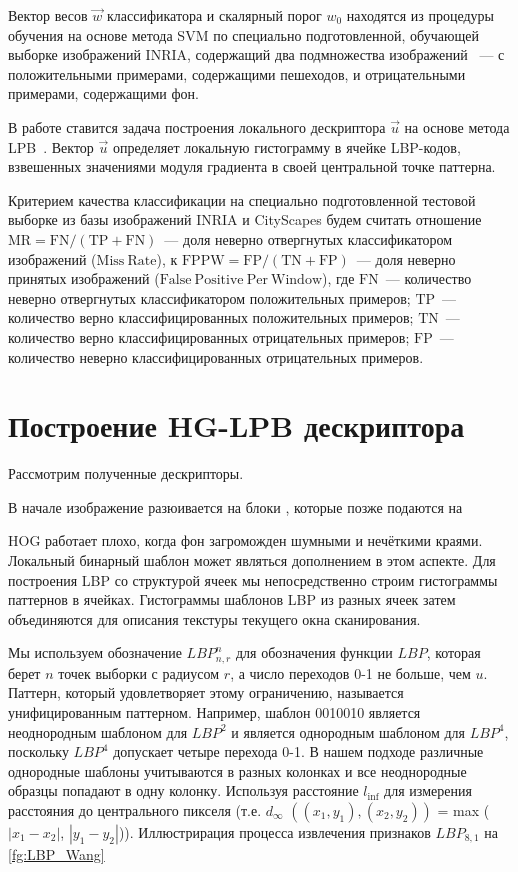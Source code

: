 \documentclass[12pt,twoside]{article}
\begin{document}
	Вектор весов $\vec{w}$ классификатора и скалярный порог $w_{0}$ находятся из процедуры обучения на основе метода SVM \cite{dalaltriggs2005} по специально подготовленной, обучающей выборке изображений INRIA, содержащий два подмножества изображений ~--- с положительными примерами, содержащими пешеходов, и отрицательными примерами, содержащими фон.

В работе ставится задача построения локального дескриптора $\vec{u}$ на основе метода LPB~\cite{Wang09}. Вектор $\vec{u}$ определяет локальную гистограмму в ячейке LBP-кодов, взвешенных значениями модуля градиента в своей центральной точке паттерна.

	Критерием качества классификации  на специально
	подготовленной тестовой выборке из базы изображений INRIA \cite{inria} и CityScapes
	будем считать отношение $\mathrm{MR} = \mathrm{FN}/(\mathrm{TP}+\mathrm{FN})$~---
	доля неверно отвергнутых классификатором изображений ($\mathrm{Miss\ Rate}$),
	к $\mathrm{FPPW} = \mathrm{FP}/(\mathrm{TN}+\mathrm{FP})$~---
	доля неверно принятых изображений ($\mathrm{False\ Positive\ Per\
	Window}$), где $\mathrm{FN}$~--- количество неверно отвергнутых
	классификатором положительных примеров; $\mathrm{TP}$~---
	количество верно классифицированных положительных примеров;
	$\mathrm{TN}$~--- количество верно классифицированных отрицательных
	примеров; $\mathrm{FP}$~--- количество неверно классифицированных отрицательных примеров.


\section{Построение HG-LPB дескриптора}
Рассмотрим полученные дескрипторы.

В начале изображение разюивается на блоки , которые позже подаются на 

HOG работает плохо, когда фон загроможден шумными и нечёткими краями. Локальный бинарный шаблон может являться дополнением в этом аспекте. Для построения LBP со структурой ячеек мы непосредственно строим гистограммы паттернов в ячейках. Гистограммы шаблонов LBP из разных ячеек затем объединяются для описания текстуры текущего окна сканирования.

 Мы используем обозначение $LBP^{n}_{n,r}$ для обозначения функции $LBP$, которая берет $n$ точек выборки с радиусом $r$, а число переходов 0-1 не больше, чем $u$. Паттерн, который удовлетворяет этому ограничению, называется унифицированным паттерном. Например, шаблон 0010010 является неоднородным шаблоном для $LBP^2$ и является однородным шаблоном для $LBP^4$, поскольку $LBP^4$ допускает четыре перехода 0-1. В нашем подходе различные однородные шаблоны учитываются в разных колонках и все неоднородные образцы попадают в одну колонку.
  Используя расстояние $l_{\inf}$ для измерения расстояния до центрального пикселя
   (т.е. $d_{\infty}$ $((x_{1}, y_{1}), (x_{2}, y_{2}))$ =
    max ($|x_{1} - x_{2}|$,
     $| y_{1} - y_{2} |$)). 
  Иллюстрирация процесса извлечения признаков $LBP_{8,1}$ на \ref{fg:LBP_Wang}
\end{document}
